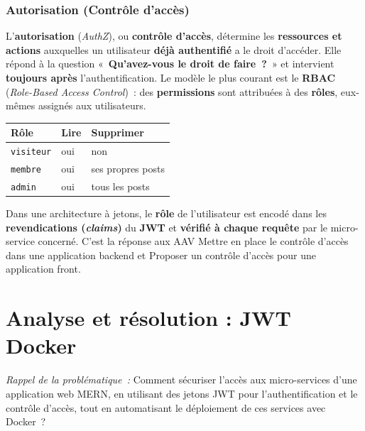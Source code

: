 \vspace{0.4cm}

\newpage

\subsubsection*{Autorisation (Contrôle d'accès)}
{}

\noindent L'\textbf{autorisation} (\textit{AuthZ}), ou \textbf{contrôle d'accès}, détermine les \textbf{ressources et actions} auxquelles un utilisateur \textbf{déjà authentifié} a le droit d'accéder. Elle répond à la question «~\textbf{Qu'avez-vous le droit de faire~?}~» et intervient \textbf{toujours après} l'authentification. Le modèle le plus courant est le \textbf{RBAC} (\textit{Role-Based Access Control})~: des \textbf{permissions} sont attribuées à des \textbf{rôles}, eux-mêmes assignés aux utilisateurs.

\begin{center}
\begin{tabular}{|l|l|l|}
\hline
\textbf{Rôle} & \textbf{Lire} & \textbf{Supprimer} \\ \hline
\texttt{visiteur} & oui & non \\ \hline
\texttt{membre}   & oui & ses propres posts \\ \hline
\texttt{admin}    & oui & tous les posts \\ \hline
\end{tabular}
\end{center}

\noindent Dans une architecture à jetons, le \textbf{rôle} de l'utilisateur est encodé dans les \textbf{revendications (\textit{claims})} du \textbf{JWT} et \textbf{vérifié à chaque requête} par le micro-service concerné. C'est la réponse aux AAV \og{}Mettre en place le contrôle d'accès dans une application backend\fg{} et \og{}Proposer un contrôle d'accès pour une application front\fg{}.

\section*{Analyse et résolution : JWT Docker}

\noindent \textit{Rappel de la problématique~:} \og{}Comment sécuriser l'accès aux micro-services d'une application web MERN, en utilisant des jetons JWT pour l'authentification et le contrôle d'accès, tout en automatisant le déploiement de ces services avec Docker~?\fg{}

